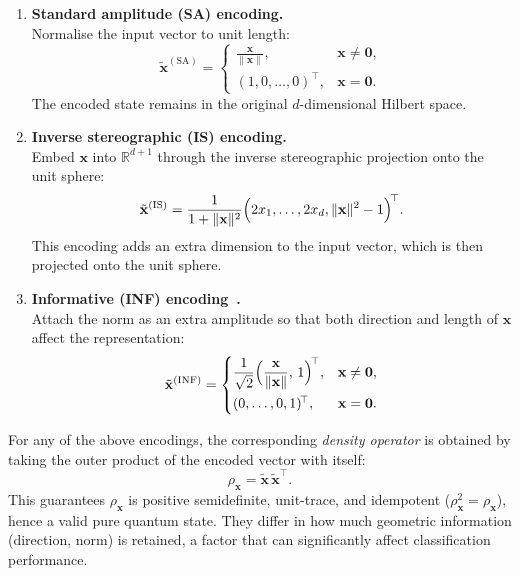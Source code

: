 \documentclass[twocolumn]{article} %
\begin{document}
\begin{enumerate}[leftmargin=*,label=\textbf{(\alph*)}]
\item \textbf{Standard amplitude (SA) encoding.}\\[2pt]
      Normalise the input vector to unit length:
      \[
        \tilde{\mathbf x}^{(\mathrm{SA})}
          =\begin{cases}
             \displaystyle\frac{\mathbf x}{\lVert\mathbf x\rVert},
               &\mathbf x\neq\mathbf 0,\\[6pt]
             (1,0,\dots,0)^{\!\top},&\mathbf x=\mathbf 0.
           \end{cases}
      \]
      The encoded state remains in the original \(d\)-dimensional
      Hilbert space.

\item \textbf{Inverse stereographic (IS) encoding.}\\[2pt]
      Embed \(\mathbf x\) into \(\mathbb R^{d+1}\) through the inverse
      stereographic projection onto the unit sphere:
      \[
        \tilde{\mathbf x}^{(\mathrm{IS})}
           =\frac{1}
                  {1+\lVert\mathbf x\rVert^{2}}
             \Bigl(2x_{1},\dots,2x_{d},
                   \lVert\mathbf x\rVert^{2}-1\Bigr)^{\!\top}.
      \]
      This encoding adds an extra dimension to the input vector, which is
      then projected onto the unit sphere.

\item \textbf{Informative (INF) encoding~\cite{Sergioli2025}.}\\[2pt]
      Attach the norm as an extra amplitude so that both direction and
      length of \(\mathbf x\) affect the representation:
      \[
        \tilde{\mathbf x}^{(\mathrm{INF})}
          =\begin{cases}
             \displaystyle
             \frac{1}{\sqrt{2}}
             \Bigl(\frac{\mathbf x}{\lVert\mathbf x\rVert},\,1\Bigr)^{\!\top},
               &\mathbf x\neq\mathbf 0,\\[8pt]
             (0,\dots,0,1)^{\!\top},
               &\mathbf x=\mathbf 0.
           \end{cases}
      \]
\end{enumerate}

\medskip
For any of the above encodings, the corresponding \emph{density
operator} is obtained by taking the outer product of the encoded
vector with itself:
\[
  \rho_{\mathbf x}= \tilde{\mathbf x}\,
                    \tilde{\mathbf x}^{\!\top}.
\]
This guarantees \(\rho_{\mathbf x}\) is positive semidefinite,
unit-trace, and idempotent (\(\rho_{\mathbf x}^{2}=\rho_{\mathbf x}\)),
hence a valid pure quantum state.
They differ in how much geometric information (direction, norm) is retained, a factor that can
significantly affect classification performance.
\end{document}
